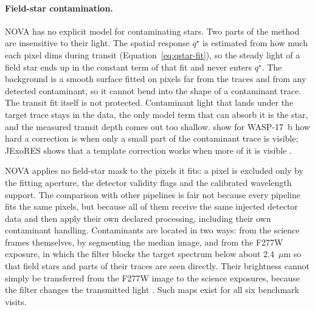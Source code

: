 \paragraph{Field-star contamination.}
NOVA has no explicit model for contaminating stars. Two parts of the
method are insensitive to their light. The spatial response $q^\star$ is
estimated from how much each pixel dims during transit
(Equation~\ref{eq:qstar-fit}), so the steady light of a field star ends up
in the constant term of that fit and never enters $q^\star$. The
background is a smooth surface fitted on pixels far from the traces and
from any detected contaminant, so it cannot bend into the shape of a
contaminant trace. The transit fit itself is not protected. Contaminant
light that lands under the target trace stays in the data, the only model
term that can absorb it is the star, and the measured transit depth comes
out too shallow. \citet{LouieEtAl2025} show for WASP-17~b how hard a
correction is when only a small part of the contaminant trace is visible;
JExoRES shows that a template correction works when more of it is visible
\citep{HolmbergMadhusudhan2023}.

NOVA applies no field-star mask to the pixels it fits: a pixel is
excluded only by the fitting aperture, the detector validity flags and
the calibrated wavelength support. The comparison with other pipelines is
fair not because every pipeline fits the same pixels, but because all of
them receive the same injected detector data and then apply their own
declared processing, including their own contaminant handling.
Contaminants are located in two ways: from the science frames themselves,
by segmenting the median image, and from the F277W exposure, in which the
filter blocks the target spectrum below about 2.4~$\mu$m so that field
stars and parts of their traces are seen directly. Their brightness
cannot simply be transferred from the F277W image to the science
exposures, because the filter changes the transmitted light
\citep{HolmbergMadhusudhan2023}. Such maps exist for all six benchmark
visits.

